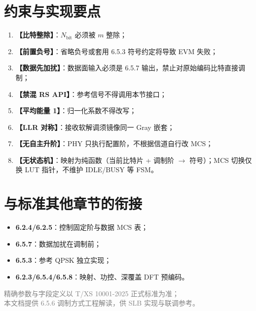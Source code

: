 \documentclass[11pt,a4paper]{ctexart}
\begin{document}
\section{约束与实现要点}

\begin{enumerate}[nosep]
  \item \textbf{【比特整除】}：$N_{\mathrm{bit}}$ 必须被 $m$ 整除；
  \item \textbf{【前置负号】}：省略负号或套用 6.5.3 符号约定将导致 EVM 失败；
  \item \textbf{【数据先加扰】}：数据面输入必须是 6.5.7 输出，禁止对原始编码比特直接调制；
  \item \textbf{【禁混 RS API】}：参考信号不得调用本节接口；
  \item \textbf{【平均能量 1】}：归一化系数不得改写；
  \item \textbf{【LLR 对称】}：接收软解调须镜像同一 Gray 嵌套；
  \item \textbf{【无自主升阶】}：PHY 只执行配置阶，不根据信道自行改 MCS；
  \item \textbf{【无状态机】}：映射为纯函数（当前比特片 + 调制阶 $\rightarrow$ 符号）；MCS 切换仅换 LUT 指针，不维护 IDLE/BUSY 等 FSM。
\end{enumerate}

\section{与标准其他章节的衔接}

\begin{itemize}[nosep]
  \item \textbf{6.2.4/6.2.5}：控制固定阶与数据 MCS 表；
  \item \textbf{6.5.7}：数据加扰在调制前；
  \item \textbf{6.5.3}：参考 QPSK 独立实现；
  \item \textbf{6.2.3/6.5.4/6.5.8}：映射、功控、深覆盖 DFT 预编码。
\end{itemize}

\vfill
\begin{center}
\small\textcolor{gray}{精确参数与字段定义以 T/XS 10001-2025 正式标准为准；\\
本文档提供 6.5.6 调制方式工程解读，供 SLB 实现与联调参考。}
\end{center}
\end{document}

